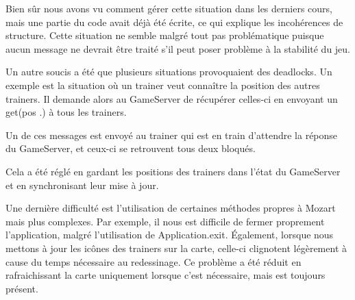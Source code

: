 \documentclass[a4paper,10pt]{article}
\begin{document}
Bien sûr nous avons vu comment gérer cette situation dans les derniers cours, mais une partie du code avait déjà été écrite, ce qui explique les incohérences de structure. Cette situation ne semble malgré tout pas problématique puisque aucun message ne devrait être traité s'il peut poser problème à la stabilité du jeu.

\vspace{0.2cm}

Un autre soucis a été que plusieurs situations provoquaient des deadlocks. Un exemple est la situation où un trainer veut connaître la position des autres trainers. Il demande alors au GameServer de récupérer celles-ci en envoyant un get(pos .) à tous les trainers.

Un de ces messages est envoyé au trainer qui est en train d'attendre la réponse du GameServer, et ceux-ci se retrouvent tous deux bloqués.

Cela a été réglé en gardant les positions des trainers dans l'état du GameServer et en synchronisant leur mise à jour.

\vspace{0.2cm}

Une dernière difficulté est l'utilisation de certaines méthodes propres à Mozart mais plus complexes. Par exemple, il nous est difficile de fermer proprement l'application, malgré l'utilisation de Application.exit. Également, lorsque nous mettons à jour les icônes des trainers sur la carte, celle-ci clignotent légèrement à cause du temps nécessaire au redessinage. Ce problème a été réduit en rafraichissant la carte uniquement lorsque c'est nécessaire, mais est toujours présent.
\end{document}
